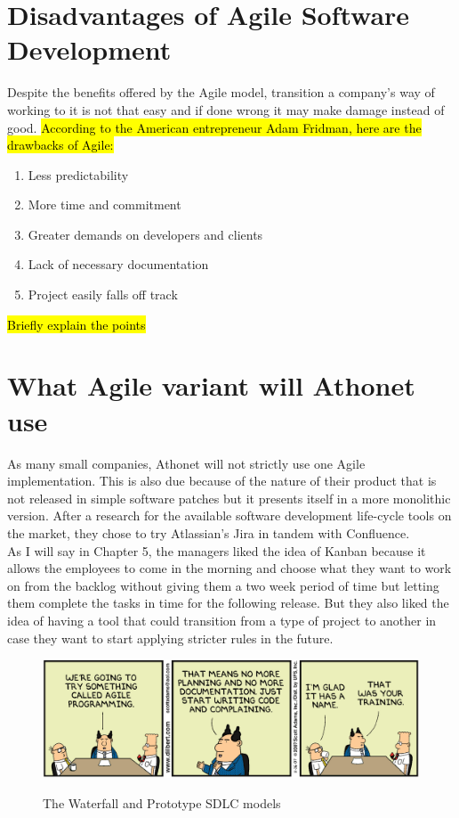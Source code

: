 \section{Disadvantages of Agile Software Development}
	Despite the benefits offered by the Agile model, transition a company's way of working to it is not that easy and if done wrong it may make damage instead of good.
	\hl{According to the American entrepreneur Adam Fridman, here are the drawbacks of Agile:}
	\begin{enumerate}
		\item Less predictability
		\item More time and commitment
		\item Greater demands on developers and clients
		\item Lack of necessary documentation
		\item Project easily falls off track
	\end{enumerate}
	\hl{Briefly explain the points}
	
\section{What Agile variant will Athonet use}
	As many small companies, Athonet will not strictly use one Agile implementation.
	This is also due because of the nature of their product that is not released in simple software patches but it presents itself in a more monolithic version.
	After a research for the available software development life-cycle tools on the market, they chose to try Atlassian's Jira in tandem with Confluence.\\
	As I will say in Chapter 5, the managers liked the idea of Kanban because it allows the employees to come in the morning and choose what they want to work on from the backlog without giving them a two week period of time but letting them complete the tasks in time for the following release.
	But they also liked the idea of having a tool that could transition from a type of project to another in case they want to start applying stricter rules in the future.
	\begin{figure}[H]
		\centering
		\includegraphics[width=\textwidth]{resources/Dilbert_Training_Agile_Programming}\\
		\caption{The Waterfall and Prototype SDLC models}
	\end{figure}


